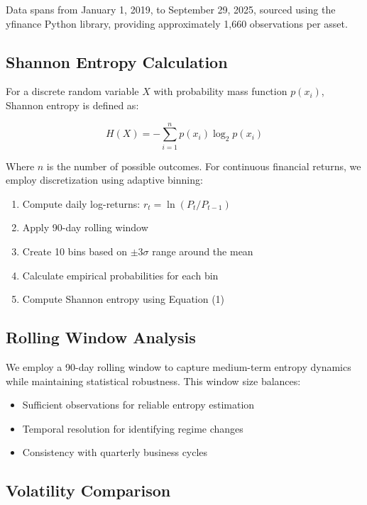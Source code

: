 \documentclass[12pt,a4paper]{article}
\begin{document}
Data spans from January 1, 2019, to September 29, 2025, sourced using the yfinance Python library, providing approximately 1,660 observations per asset.

\subsection{Shannon Entropy Calculation}

For a discrete random variable $X$ with probability mass function $p(x_i)$, Shannon entropy is defined as:

\begin{equation}
H(X) = -\sum_{i=1}^{n} p(x_i) \log_2 p(x_i)
\end{equation}

Where $n$ is the number of possible outcomes. For continuous financial returns, we employ discretization using adaptive binning:

\begin{enumerate}
    \item Compute daily log-returns: $r_t = \ln(P_t / P_{t-1})$
    \item Apply 90-day rolling window
    \item Create 10 bins based on $\pm 3\sigma$ range around the mean
    \item Calculate empirical probabilities for each bin
    \item Compute Shannon entropy using Equation (1)
\end{enumerate}

\subsection{Rolling Window Analysis}

We employ a 90-day rolling window to capture medium-term entropy dynamics while maintaining statistical robustness. This window size balances:
\begin{itemize}
    \item Sufficient observations for reliable entropy estimation
    \item Temporal resolution for identifying regime changes
    \item Consistency with quarterly business cycles
\end{itemize}

\subsection{Volatility Comparison}
\end{document}
